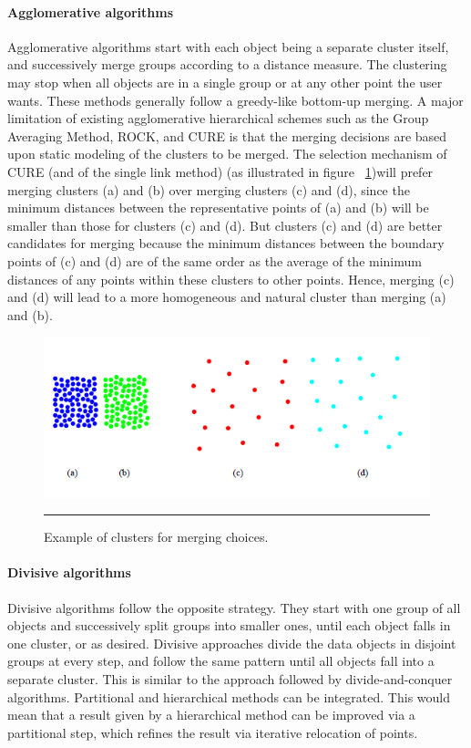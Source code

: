 \paragraph{Agglomerative algorithms}
Agglomerative algorithms start with each object being a separate cluster itself, and successively
merge groups according to a distance measure. The clustering may stop when all objects are in
a single group or at any other point the user wants.
These methods generally follow a greedy-like bottom-up merging.
A major limitation of existing agglomerative hierarchical schemes such as the Group Averaging Method,
ROCK, and CURE is that the merging decisions are based upon static modeling of the clusters to
be merged. The selection mechanism of CURE (and of the single link method) (as illustrated in figure ~\ref{fig:hir_fail})will prefer merging clusters (a) and (b) over merging clusters (c) and (d), since the minimum distances between the representative points of (a) and (b) will be smaller than those for clusters (c) and
(d). But clusters (c) and (d) are better candidates for merging because the minimum distances between the boundary
points of (c) and (d) are of the same order as the average of the minimum distances of any points within these clusters
to other points. Hence, merging (c) and (d) will lead to a more homogeneous and natural cluster than merging (a) and
(b).
\begin{figure}[htbp]
	\centering
		\includegraphics{./Figures/clustering_3.png}
		\rule{35em}{0.5pt}
	\caption[Example of clusters for merging choices.]{Example of clusters for merging choices.}
	\label{fig:hir_fail}
\end{figure}

\paragraph{Divisive algorithms} Divisive algorithms follow the opposite strategy. They start with one group of all objects and
successively split groups into smaller ones, until each object falls in one cluster, or as desired.
Divisive approaches divide the data objects in disjoint groups at every step, and follow the same
pattern until all objects fall into a separate cluster. This is similar to the approach followed by
divide-and-conquer algorithms.
Partitional and hierarchical methods can be integrated. This would mean that a result given by a hierarchical
method can be improved via a partitional step, which refines the result via iterative relocation
of points.



